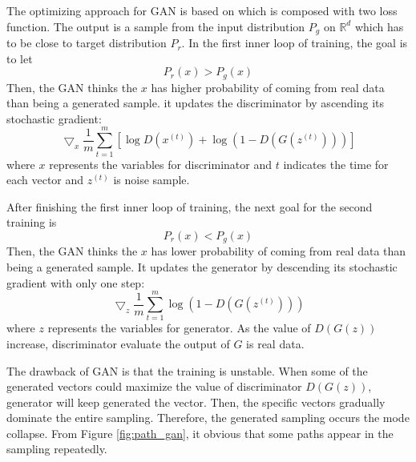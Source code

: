 \documentclass{article}
\begin{document}
	The optimizing approach for GAN is based on \cite{goodfellow} which is composed with two loss function.
	The output is a sample from the input distribution $P_{g}$ on $\mathbb{R}^d$ which has to be close to target distribution $P_{r}$.
	In the first inner loop of training, 
	the goal is to let 
	\begin{equation}
		P_r(x) > P_g(x)
	\end{equation}
	Then, the GAN thinks the $x$ has higher probability of coming from real data than being a generated sample.
	it updates the discriminator by ascending its stochastic gradient:
	\begin{equation}
		\bigtriangledown_{x} \frac{1}{m} \sum_{t=1}^{m} \left[ \log D(x^{\left(t\right)}) + \log \left(1-D\left(G\left(z^{(t)}\right)\right)\right)\right]
	\end{equation}
	where $x$ represents the variables for discriminator and $t$ indicates the time for each vector and $z^{(t)}$ is noise sample.
	
	After finishing the first inner loop of training, the next goal for the second training is 
	\begin{equation}
	P_r(x) < P_g(x)
	\end{equation}
	Then, the GAN thinks the $x$ has lower probability of coming from real data than being a generated sample.
	It updates the generator by descending its stochastic gradient with only one step:
	\begin{equation}
		\bigtriangledown_{z} \frac{1}{m} \sum_{t=1}^{m} \log \left(1-D\left(G\left(z^{(t)}\right)\right)\right)
		\label{eq:loss_gan}
	\end{equation}
	where $z$ represents the variables for generator.
	As the value of $D(G(z))$ increase, discriminator evaluate the output of $G$ is real data. 
	
	The drawback of GAN is that the training is unstable. 
	When some of the generated vectors could maximize the value of discriminator $D(G(z))$, generator will keep generated the vector.
	Then, the specific vectors gradually  dominate the entire sampling.
	Therefore, the generated sampling occurs the mode collapse.
	From Figure \ref{fig:path_gan}, it obvious that some paths appear in the sampling repeatedly.
	
	
\end{document}
